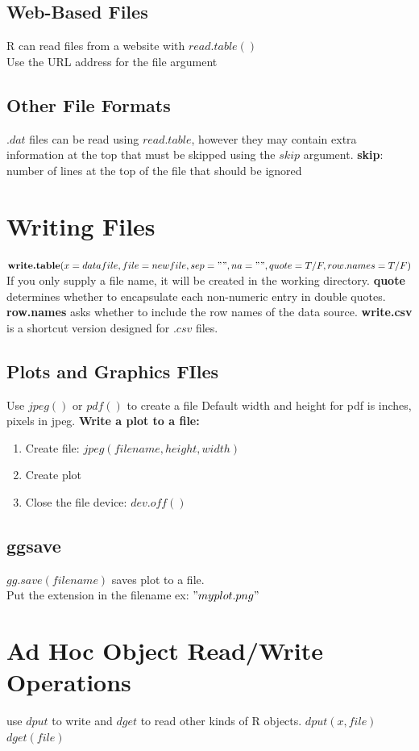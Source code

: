 \documentclass[openany]{book}
\begin{document}
\begin{flushleft}
\subsection{Web-Based Files}
R can read files from a website with $read.table()$\\
Use the URL address for the file argument
\subsection{Other File Formats}
$.dat$ files can be read using $read.table$, however they may contain extra information at the top that must be skipped using the $skip$ argument. \medbreak
\textbf{skip}: number of lines at the top of the file that should be ignored

\section{Writing Files}
$\textbf{write.table}(x=datafile,file=newfile,sep="",na="",quote=T/F,row.names=T/F)$ \medbreak
If you only supply a file name, it will be created in the working directory. \medbreak
\textbf{quote} determines whether to encapsulate each non-numeric entry in double quotes. \medbreak
\textbf{row.names} asks whether to include the row names of the data source. \medbreak
\textbf{write.csv} is a shortcut version designed for $.csv$ files.
\subsection{Plots and Graphics FIles}
Use $jpeg()$ or $pdf()$ to create a file \medbreak
Default width and height for pdf is inches, pixels in jpeg. \medbreak
\textbf{Write a plot to a file:}
\begin{enumerate}
\item Create file: $jpeg(filename,height,width)$
\item Create plot
\item Close the file device: $dev.off()$
\end{enumerate}
\subsection{ggsave}
$gg.save(filename)$ saves plot to a file.\\
Put the extension in the filename ex: $"myplot.png"$ \medbreak
\section{Ad Hoc Object Read/Write Operations}
use $dput$ to write and $dget$ to read other kinds of R objects. \medbreak
$dput(x,file)$ \quad $dget(file)$

\end{flushleft}
\end{document}
